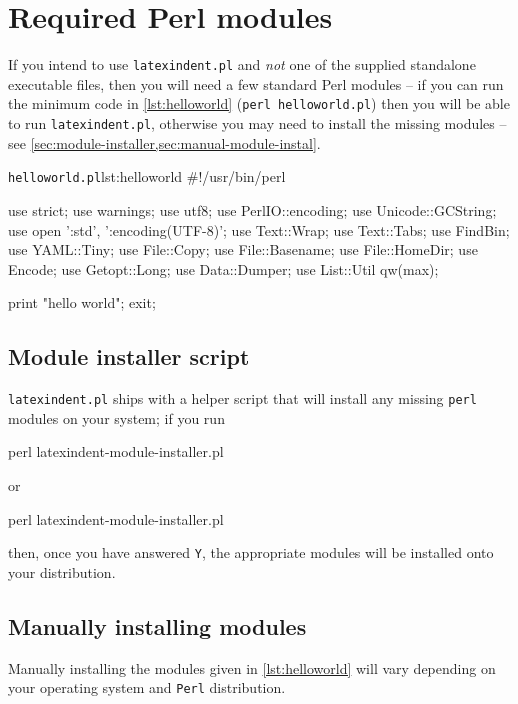 \appendix
	\section{Required Perl modules}\label{sec:requiredmodules}
	 If you intend to use \texttt{latexindent.pl} and \emph{not} one of the supplied
	 standalone executable files, then you will need a few standard Perl modules -- if you can
	 run the minimum code in \cref{lst:helloworld} (\texttt{perl helloworld.pl}) then you will
	 be able to run \texttt{latexindent.pl}, otherwise you may need to install the missing
	 modules -- see \cref{sec:module-installer,sec:manual-module-instal}.

	 \begin{cmhlistings}[style=tcblatex,language=Perl]{\texttt{helloworld.pl}}{lst:helloworld}
#!/usr/bin/perl

use strict;
use warnings;
use utf8;
use PerlIO::encoding;
use Unicode::GCString;
use open ':std', ':encoding(UTF-8)';
use Text::Wrap;
use Text::Tabs;
use FindBin;
use YAML::Tiny;
use File::Copy;
use File::Basename;
use File::HomeDir;
use Encode;
use Getopt::Long;
use Data::Dumper;
use List::Util qw(max);

print "hello world";
exit;
\end{cmhlistings}

	\subsection{Module installer script}\label{sec:module-installer}
		 \texttt{latexindent.pl} ships with a
		helper script that will install any missing \texttt{perl} modules on your system; if you
		run
		\begin{commandshell}
perl latexindent-module-installer.pl
\end{commandshell}
		or
		\begin{dosprompt}
perl latexindent-module-installer.pl
 \end{dosprompt}
		then, once you have answered \texttt{Y}, the appropriate modules will be installed onto
		your distribution.

	\subsection{Manually installing modules}\label{sec:manual-module-instal}
		Manually installing the modules given in \cref{lst:helloworld} will vary depending on
		your operating system and \texttt{Perl} distribution.

